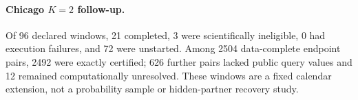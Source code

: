 \paragraph{Chicago $K=2$ follow-up.} Of 96 declared windows, 21 completed, 3 were scientifically ineligible, 0 had execution failures, and 72 were unstarted. Among 2504 data-complete endpoint pairs, 2492 were exactly certified; 626 further pairs lacked public query values and 12 remained computationally unresolved. These windows are a fixed calendar extension, not a probability sample or hidden-partner recovery study.
